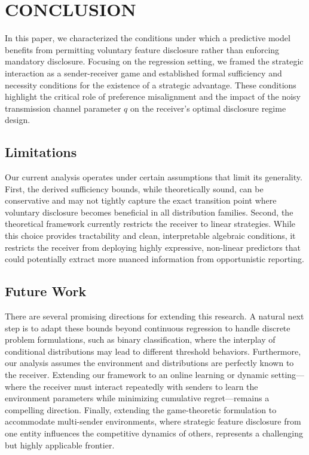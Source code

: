 \section{CONCLUSION}

In this paper, we characterized the conditions under which a predictive model benefits from permitting voluntary feature disclosure rather than enforcing mandatory disclosure. Focusing on the regression setting, we framed the strategic interaction as a sender-receiver game and established formal sufficiency and necessity conditions for the existence of a strategic advantage. These conditions highlight the critical role of preference misalignment and the impact of the noisy transmission channel parameter $q$ on the receiver's optimal disclosure regime design. 

\subsection{Limitations}
Our current analysis operates under certain assumptions that limit its generality. First, the derived sufficiency bounds, while theoretically sound, can be conservative and may not tightly capture the exact transition point where voluntary disclosure becomes beneficial in all distribution families. Second, the theoretical framework currently restricts the receiver to linear strategies. While this choice provides tractability and clean, interpretable algebraic conditions, it restricts the receiver from deploying highly expressive, non-linear predictors that could potentially extract more nuanced information from opportunistic reporting. 

\subsection{Future Work}
There are several promising directions for extending this research. A natural next step is to adapt these bounds beyond continuous regression to handle discrete problem formulations, such as binary classification, where the interplay of conditional distributions may lead to different threshold behaviors. Furthermore, our analysis assumes the environment and distributions are perfectly known to the receiver. Extending our framework to an online learning or dynamic setting---where the receiver must interact repeatedly with senders to learn the environment parameters while minimizing cumulative regret---remains a compelling direction. Finally, extending the game-theoretic formulation to accommodate multi-sender environments, where strategic feature disclosure from one entity influences the competitive dynamics of others, represents a challenging but highly applicable frontier.

